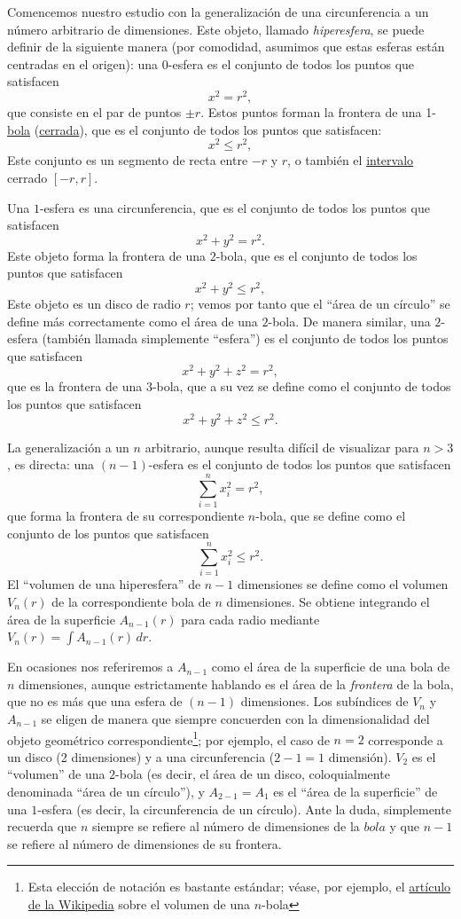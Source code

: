 Comencemos nuestro estudio con la generalización de una circunferencia a un número arbitrario de dimensiones. Este objeto, llamado \emph{hiperesfera}, se puede definir de la siguiente manera (por comodidad, asumimos que estas esferas están centradas en el origen): una $0$-esfera es el conjunto de todos los puntos que satisfacen
\[
x^2 = r^2,
\]
que consiste en el par de puntos $\pm r$. Estos puntos forman la frontera de una 1-\href{https://es.wikipedia.org/wiki/Bola_(matem%C3%A1tica)}{bola} (\href{https://es.wikipedia.org/wiki/Conjunto_cerrado}{cerrada}), que es el conjunto de todos los puntos que satisfacen:
\[
x^2 \leq r^2,
\]
Este conjunto es un segmento de recta entre $-r$ y $r$, o también el \href{https://es.wikipedia.org/wiki/Intervalo_(matem%C3%A1tica)}{intervalo} cerrado $[-r, r]$. 

Una $1$-esfera es una circunferencia, que es el conjunto de todos los puntos que satisfacen
\[
x^2 + y^2 = r^2.
\]
Este objeto forma la frontera de una $2$-bola, que es el conjunto de todos los puntos que satisfacen
\[
x^2 + y^2 \leq r^2,
\]
Este objeto es un disco de radio $r$; vemos por tanto que el ``área de un círculo'' se define más correctamente como el área de una $2$-bola. De manera similar, una $2$-esfera (también llamada simplemente ``esfera'') es el conjunto de todos los puntos que satisfacen
\[
x^2 + y^2 + z^2 = r^2,
\]
que es la frontera de una $3$-bola, que a su vez se define como el conjunto de todos los puntos que satisfacen
\[
x^2 + y^2 + z^2 \leq r^2.
\]

La generalización a un $n$ arbitrario, aunque resulta difícil de visualizar para $n > 3$, es directa: una $(n-1)$-esfera es el conjunto de todos los puntos que satisfacen
\[
\sum_{i=1}^{n} x_i^2 = r^2,
\]
que forma la frontera de su correspondiente $n$-bola, que se define como el conjunto de los puntos que satisfacen
\[
\sum_{i=1}^{n} x_i^2 \leq r^2.
\]
El ``volumen de una hiperesfera'' de $n-1$ dimensiones se define como el volumen $V_n(r)$ de la correspondiente bola de $n$ dimensiones. Se obtiene integrando el área de la superficie $A_{n-1}(r)$ para cada radio mediante $V_n(r) = \int A_{n-1}(r)\,dr$.

En ocasiones nos referiremos a $A_{n-1}$ como el área de la superficie de una bola de $n$ dimensiones, aunque estrictamente hablando es el área de la \emph{frontera} de la bola, que no es más que una esfera de $(n-1)$ dimensiones. Los subíndices de $V_n$ y $A_{n-1}$ se eligen de manera que siempre concuerden con la dimensionalidad del objeto geométrico correspondiente\footnote{Esta elección de notación es bastante estándar; véase, por ejemplo, el \href{https://es.wikipedia.org/wiki/Volumen_de_una_n-bola}{artículo de la Wikipedia} sobre el volumen de una $n$-bola}; por ejemplo, el caso de $n=2$ corresponde a un disco (2 dimensiones) y a una circunferencia ($2-1 = 1$ dimensión). $V_2$ es el ``volumen'' de una $2$-bola (es decir, el área de un disco, coloquialmente denominada ``área de un círculo''), y $A_{2-1} = A_1$ es el ``área de la superficie'' de una $1$-esfera (es decir, la circunferencia de un círculo). Ante la duda, simplemente recuerda que $n$ siempre se refiere al número de dimensiones de la $bola$ y que $n-1$ se refiere al número de dimensiones de su frontera. 

